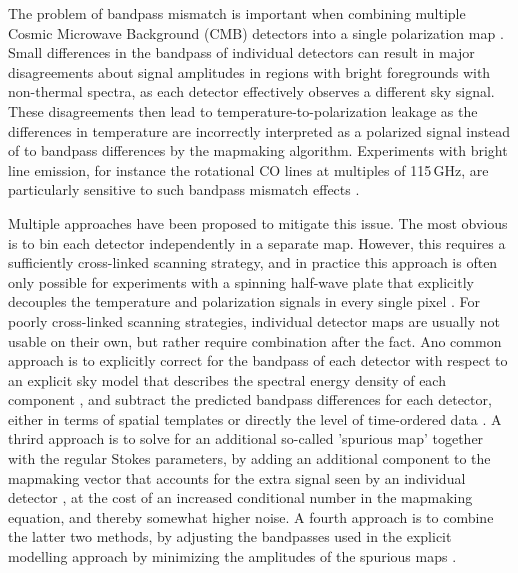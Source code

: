 \documentclass{aa}
\begin{document}
The problem of bandpass mismatch is important when combining multiple Cosmic Microwave Background (CMB) detectors into a single polarization map \citep[e.g.,][]{page:2007,lfi2015,BP09}. Small differences in the bandpass of individual detectors can result in major disagreements about signal amplitudes in regions with bright foregrounds with non-thermal spectra, as each detector effectively observes a different sky signal. These disagreements then lead to temperature-to-polarization leakage as the differences in temperature are incorrectly interpreted as a polarized signal instead of to bandpass differences by the mapmaking algorithm. Experiments with bright line emission, for instance the rotational CO lines at multiples of 115\,GHz, are particularly sensitive to such bandpass mismatch effects \citep[e.g.,][]{hfi_processing:2013}. 

Multiple approaches have been proposed to mitigate this issue. The most obvious is to bin each detector independently in a separate map. However, this requires a sufficiently cross-linked scanning strategy, and in practice this approach is often only possible for experiments with a spinning half-wave plate that explicitly decouples the temperature and polarization signals in every single pixel \citep[e.g.,][]{abs:2016}. For poorly cross-linked scanning strategies, individual detector maps are usually not usable on their own, but rather require combination after the fact. Ano common approach is to explicitly correct for the bandpass of each detector with respect to an explicit sky model that describes the spectral energy density of each component \citep[e.g.,][]{planck_fg:2015}, and subtract the predicted bandpass differences for each detector, either in terms of spatial templates \citep[e.g.,][]{lfi2015} or directly the level of time-ordered data \citep{bp01}. A thrird approach is to solve for an additional so-called 'spurious map' together with the regular Stokes parameters, by adding an additional component to the mapmaking vector that accounts for the extra signal seen by an individual detector \citep{spurious}, at the cost of an increased conditional number in the mapmaking equation, and thereby somewhat higher noise. A fourth approach is to combine the latter two methods, by adjusting the bandpasses used in the explicit modelling approach by minimizing the amplitudes of the spurious maps \citep{BP09}.
\end{document}
